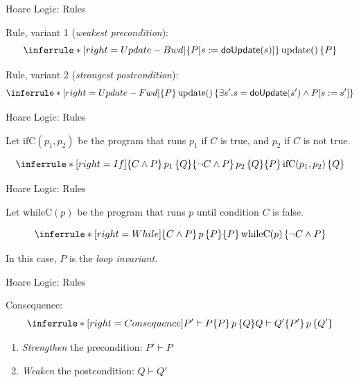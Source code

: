 \documentclass[xetex,aspectratio=169,14pt,hyperref={pdfpagelabels=true,pdflang={en-GB}}]{beamer}
\begin{document}
\begin{frame}
  {Hoare Logic: Rules}

  Rule, variant 1 (\emph{weakest precondition}):
  \begin{displaymath}
    \inferrule* [right=Update-Bwd]
    { }
    {\{ P[s := \mathsf{doUpdate}(s)] \}\,\mathrm{update}()\,\{ P \}}
  \end{displaymath}

  \bigskip

  Rule, variant 2 (\emph{strongest postcondition}):
  \begin{displaymath}
    \inferrule* [right=Update-Fwd]
    { }
    {\{ P \}\,\mathrm{update}()\,\{ \exists s'. s = \mathsf{doUpdate}(s') \land P[s := s'] \}}
  \end{displaymath}
\end{frame}

\begin{frame}
  {Hoare Logic: Rules}

  Let $\mathrm{ifC}(p_1,p_2)$ be the program that runs $p_1$ if $C$ is true, and $p_2$ if $C$ is not true.

  \bigskip

  \begin{displaymath}
    \inferrule* [right=If]
    {\{ C \land P \}\,p_1\,\{ Q \} \\ \{ \lnot C \land P \}\,p_2\,\{ Q \}}
    {\{ P \}\,\mathrm{ifC}(p_1,p_2)\,\{ Q \}}
  \end{displaymath}
\end{frame}

\begin{frame}
  {Hoare Logic: Rules}

  Let $\mathrm{whileC}(p)$ be the program that runs $p$ until condition $C$ is false.

  \bigskip

  \begin{displaymath}
    \inferrule* [right=While]
    {\{ C \land P \}\,p\,\{ P \}}
    {\{ P \}\,\mathrm{whileC}(p)\,\{ \lnot C \land P \}}
  \end{displaymath}

  \bigskip

  In this case, $P$ is the \emph{loop invariant}.
\end{frame}

\begin{frame}
  {Hoare Logic: Rules}

  Consequence:
  \begin{displaymath}
    \inferrule* [right=Consequence]
    {P' \vdash P \\ \{ P \}\,p\,\{ Q \} \\ Q \vdash Q'}
    {\{ P' \}\,p\,\{ Q' \}}
  \end{displaymath}

  \bigskip
  \begin{enumerate}
  \item \emph{Strengthen} the precondition: $P' \vdash P$
  \item \emph{Weaken} the postcondition: $Q \vdash Q'$
  \end{enumerate}
\end{frame}
\end{document}
